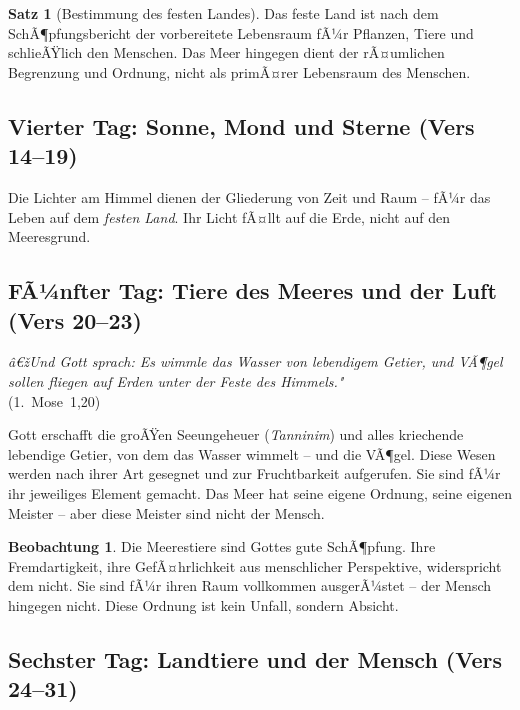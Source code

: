 ﻿\documentclass[a4paper,12pt]{article}
\theoremstyle{definition}
\newtheorem{theorem}{Satz}[section]
\newtheorem{observation}{Beobachtung}[section]
\begin{document}
\begin{theorem}[Bestimmung des festen Landes]
    Das feste Land ist nach dem SchÃ¶pfungsbericht der vorbereitete Lebensraum fÃ¼r
    Pflanzen, Tiere und schlieÃŸlich den Menschen. Das Meer hingegen dient der
    rÃ¤umlichen Begrenzung und Ordnung, nicht als primÃ¤rer Lebensraum des Menschen.
\end{theorem}

\subsection{Vierter Tag: Sonne, Mond und Sterne (Vers 14--19)}

Die Lichter am Himmel dienen der Gliederung von Zeit und Raum -- fÃ¼r das Leben
auf dem \textit{festen Land}. Ihr Licht fÃ¤llt auf die Erde, nicht auf den Meeresgrund.

\subsection{FÃ¼nfter Tag: Tiere des Meeres und der Luft (Vers 20--23)}

\begin{displayquote}
    \textit{â€žUnd Gott sprach: Es wimmle das Wasser von lebendigem Getier, und
    VÃ¶gel sollen fliegen auf Erden unter der Feste des Himmels."}\\
    \hfill (1.~Mose~1,20)
\end{displayquote}

Gott erschafft die groÃŸen Seeungeheuer (\textit{Tanninim}) und alles kriechende
lebendige Getier, von dem das Wasser wimmelt -- und die VÃ¶gel. Diese Wesen werden
nach ihrer Art gesegnet und zur Fruchtbarkeit aufgerufen. Sie sind fÃ¼r ihr
jeweiliges Element gemacht. Das Meer hat seine eigene Ordnung, seine eigenen
Meister -- aber diese Meister sind nicht der Mensch.

\begin{observation}
    Die Meerestiere sind Gottes gute SchÃ¶pfung. Ihre Fremdartigkeit, ihre
    GefÃ¤hrlichkeit aus menschlicher Perspektive, widerspricht dem nicht. Sie sind
    fÃ¼r ihren Raum vollkommen ausgerÃ¼stet -- der Mensch hingegen nicht. Diese
    Ordnung ist kein Unfall, sondern Absicht.
\end{observation}

\subsection{Sechster Tag: Landtiere und der Mensch (Vers 24--31)}
\end{document}

